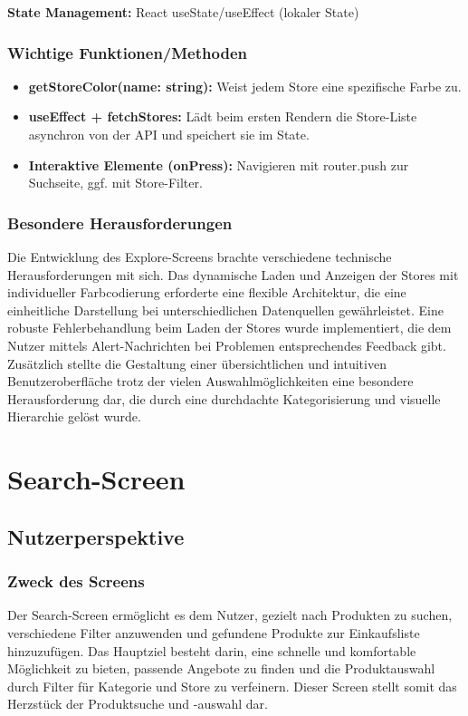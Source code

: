 \noindent\textbf{State Management:} React useState/useEffect (lokaler State)

\subsubsection{Wichtige Funktionen/Methoden}

\begin{itemize}
    \item \textbf{getStoreColor(name: string):} Weist jedem Store eine spezifische Farbe zu.
    \item \textbf{useEffect + fetchStores:} Lädt beim ersten Rendern die Store-Liste asynchron von der API und speichert sie im State.
    \item \textbf{Interaktive Elemente (onPress):} Navigieren mit router.push zur Suchseite, ggf. mit Store-Filter.
\end{itemize}

\subsubsection{Besondere Herausforderungen}
Die Entwicklung des Explore-Screens brachte verschiedene technische Herausforderungen mit sich. Das dynamische Laden und Anzeigen der Stores mit individueller Farbcodierung erforderte eine flexible Architektur, die eine einheitliche Darstellung bei unterschiedlichen Datenquellen gewährleistet. Eine robuste Fehlerbehandlung beim Laden der Stores wurde implementiert, die dem Nutzer mittels Alert-Nachrichten bei Problemen entsprechendes Feedback gibt. Zusätzlich stellte die Gestaltung einer übersichtlichen und intuitiven Benutzeroberfläche trotz der vielen Auswahlmöglichkeiten eine besondere Herausforderung dar, die durch eine durchdachte Kategorisierung und visuelle Hierarchie gelöst wurde.

\section{Search-Screen}
\label{sec:search_screen}

\subsection{Nutzerperspektive}

\subsubsection{Zweck des Screens}
Der Search-Screen ermöglicht es dem Nutzer, gezielt nach Produkten zu suchen, verschiedene Filter anzuwenden und gefundene Produkte zur Einkaufsliste hinzuzufügen. Das Hauptziel besteht darin, eine schnelle und komfortable Möglichkeit zu bieten, passende Angebote zu finden und die Produktauswahl durch Filter für Kategorie und Store zu verfeinern. Dieser Screen stellt somit das Herzstück der Produktsuche und -auswahl dar.

